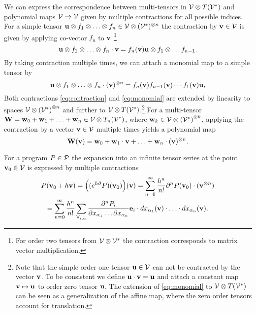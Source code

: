  We can express the
 correspondence between multi-tensors in $\mathcal{V}\otimes T(\mathcal{V}^*)$ and polynomial maps
 $\mathcal{V}\to \mathcal{V}$ given by multiple contractions for all possible indices. For a simple tensor $\mathbf{u}\otimes
 f_1\otimes\ldots\otimes f_n\in \mathcal{V}\otimes(\mathcal{V}^*)^{\otimes n}$ the contraction by
 $\mathbf{v}\in \mathcal{V}$ is given by applying co-vector $f_n$ to $\mathbf{v}$ \footnote{For order
   two tensors from $\mathcal{V}\otimes\mathcal{V}^*$ the contraction corresponds to
matrix vector multiplication.}
 \begin{equation}
   \label{eq:contraction}
 \mathbf{u}\otimes f_1\otimes\ldots\otimes f_n\cdot \mathbf{v} = f_n(\mathbf{v}) \mathbf{u}\otimes f_1\otimes\ldots f_{n-1}.
\end{equation}
By taking contraction multiple times, we can attach a monomial map to a
simple tensor by  
 \begin{equation}
   \label{eq:monomial}
 \mathbf{u}\otimes f_1\otimes\ldots\otimes f_n\cdot (\mathbf{v})^{\otimes n} = f_n(\mathbf{v})f_{n-1}(\mathbf{v})\cdots f_1(\mathbf{v}) \mathbf{u},
\end{equation}
Both contractions \eqref{eq:contraction} and \eqref{eq:monomial} are extended
by linearity to spaces $\mathcal{V}\otimes \left(\mathcal{V}^*\right)^{\otimes n}$ and further
to $\mathcal{V}\otimes T(\mathcal{V}^*)$.\footnote{Note that the simple order one tensor
  $\mathbf{u}\in\mathcal{V}$ can not be contracted by the vector $\mathbf{v}$. To be consistent we
  define $\mathbf{u}\cdot \mathbf{v} = \mathbf{u}$ and attach a constant map
  $\mathbf{v}\mapsto \mathbf{u}$ to order zero tensor $\mathbf{u}$. The extension of
  \eqref{eq:monomial}
  to $\mathcal{V}\otimes T(\mathcal{V}^*)$ can be seen as a generalization of the affine map,
  where the zero order tensors account for translation.}
For a multi-tensor $\mathbf{W}=\mathbf{w}_0+\mathbf{w}_1+\ldots+\mathbf{w}_n\in\mathcal{V}\otimes T_n(\mathcal{V}^*)$,
where $\mathbf{w}_k\in\mathcal{V}\otimes\left( \mathcal{V}^*\right)^{\otimes k}$, applying the
contraction by a vector $\mathbf{v}\in \mathcal{V}$ multiple times yields a polynomial map
\begin{equation}
  \label{eq:polynomial_tensor}
  \mathbf{W}(\mathbf{v}) = \mathbf{w}_0+\mathbf{w}_1\cdot \mathbf{v}+\ldots+\mathbf{w}_n\cdot (\mathbf{v})^{\otimes n}.
\end{equation}
\begin{theorem}\label{izr:e^d}
  For a program $P\in\mathcal{P}$  the expansion into an infinite tensor series
  at the point $\mathbf{v}_0\in \mathcal{V}$ is expressed by multiple contractions 
  \begin{multline}\label{eq:tenzorVrsta}
  P(\mathbf{v}_0+h\mathbf{v}) = \Big((e^{h\partial}P)(\mathbf{v}_0)\Big)(\mathbf{v})
  = \sum_{n=0}^\infty\frac{h^n}{n!}\partial^nP(\mathbf{v}_0)\cdot (\mathbf{v}^{\otimes n})\\
  = \sum_{n=0}^\infty \frac{h^n}{n!}\sum_{\forall_{i,\alpha}}\frac{\partial^nP_i}{\partial
        x_{\alpha_1}\ldots \partial x_{\alpha_n}}\mathbf{e}_i\cdot
      dx_{\alpha_1}(\mathbf{v})\cdot\ldots \cdot dx_{\alpha_n}(\mathbf{v}).
  \end{multline}
\end{theorem}
 
